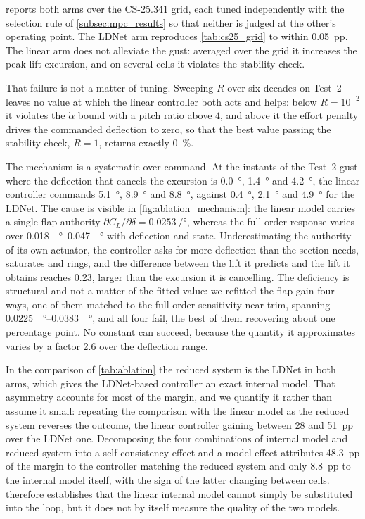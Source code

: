  reports both arms over the CS-25.341 grid, each tuned
independently with the selection rule of \cref{subsec:mpc_results} so that
neither is judged at the other's operating point. The LDNet arm reproduces
\cref{tab:cs25_grid} to within \SI{0.05}{pp}. The linear arm does not
alleviate the gust: averaged over the grid it increases the peak lift
excursion, and on several cells it violates the stability check.

That failure is not a matter of tuning. Sweeping $R$ over six decades on
Test~2 leaves no value at which the linear controller both acts and helps:
below $R=10^{-2}$ it violates the $\dot\alpha$ bound with a pitch ratio
above $4$, and above it the effort penalty drives the commanded deflection
to zero, so that the best value passing the stability check, $R=1$, returns
exactly \SI{0}{\percent}.

The mechanism is a systematic over-command. At the instants of the Test~2
gust where the deflection that cancels the excursion is \SI{0.0}{\degree},
\SI{1.4}{\degree} and \SI{4.2}{\degree}, the linear controller commands
\SI{5.1}{\degree}, \SI{8.9}{\degree} and \SI{8.8}{\degree}, against
\SI{0.4}{\degree}, \SI{2.1}{\degree} and \SI{4.9}{\degree} for the LDNet.
The cause is visible in \cref{fig:ablation_mechanism}: the linear model
carries a single flap authority
$\partial C_L/\partial\delta=\SI{0.0253}{\per\degree}$, whereas the
full-order response varies over \SIrange{0.018}{0.047}{\per\degree} with
deflection and state. Underestimating the authority of its own actuator,
the controller asks for more deflection than the section needs, saturates
and rings, and the difference between the lift it predicts and the lift it
obtains reaches \num{0.23}, larger than the excursion it is cancelling.
The deficiency is structural and not a matter of the fitted value: we
refitted the flap gain four ways, one of them matched to the full-order
sensitivity near trim, spanning \SIrange{0.0225}{0.0383}{\per\degree}, and
all four fail, the best of them recovering about one percentage point. No
constant can succeed, because the quantity it approximates varies by a
factor \num{2.6} over the deflection range.

In the comparison of \cref{tab:ablation} the reduced system is the LDNet in
both arms, which gives the LDNet-based controller an exact internal model.
That asymmetry accounts for most of the margin, and we quantify it rather
than assume it small: repeating the comparison with the linear model as the
reduced system reverses the outcome, the linear controller gaining between
\num{28} and \SI{51}{pp} over the LDNet one. Decomposing the four
combinations of internal model and reduced system into a self-consistency
effect and a model effect attributes \SI{48.3}{pp} of the margin to the
controller matching the reduced system and only \SI{8.8}{pp} to the internal
model itself, with the sign of the latter changing between cells.
 therefore establishes that the linear internal model
cannot simply be substituted into the loop, but it does not by itself
measure the quality of the two models.


